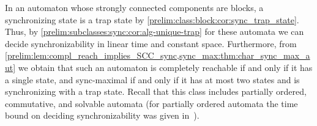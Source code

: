 
In an automaton whose strongly connected components are blocks, a synchronizing state
is a trap state by \cref{prelim:class:block:cor:sync_trap_state}.
Thus, by \cref{prelim:subclasses:sync:cor:alg-unique-trap} for these automata
we can decide synchronizability in linear time and constant space.
Furthermore, from \cref{prelim:lem:compl_reach_implies_SCC_sync,sync_max:thm:char_sync_max_aut} 
we obtain that such an automaton is completely reachable if and only if it has a single state,
and sync-maximal if and only if it has at most two states and is synchronizing with a trap state.
Recall that this class includes partially ordered, commutative,
and solvable automata (for partially 
ordered automata the time bound on deciding synchronizability was given in~\cite[Cor.~6]{DBLP:conf/dlt/Hoffmann21a}).

